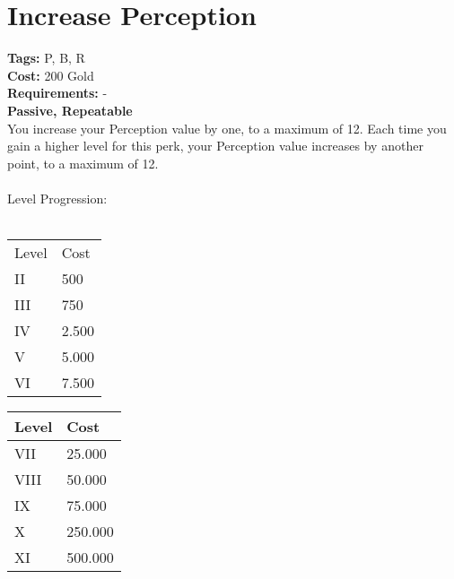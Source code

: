 \section*{Increase Perception}\label{sec:increaseperception}
\textbf{Tags:} P, B, R\\
\textbf{Cost:} 200 Gold\\
\textbf{Requirements:} -\\
\textbf{Passive, Repeatable}\\
You increase your Perception value by one, to a maximum of 12.
Each time you gain a higher level for this perk, your Perception value increases by another point, to a maximum of 12.\\
\\
Level Progression:\\
\\
\begin{minipage}{0.5\textwidth}
    \begin{tabular}{l | l}
        Level & Cost\\
        II & 500\\
        III & 750\\
        IV & 2.500\\
        V & 5.000\\
        VI & 7.500\\
    \end{tabular}
\end{minipage}
\begin{minipage}{0.5\textwidth}
    \begin{tabular}{l | l}
        Level & Cost\\ \hline
        VII & 25.000\\
        VIII & 50.000\\
        IX & 75.000\\
        X & 250.000\\
        XI & 500.000\\
    \end{tabular}
\end{minipage}